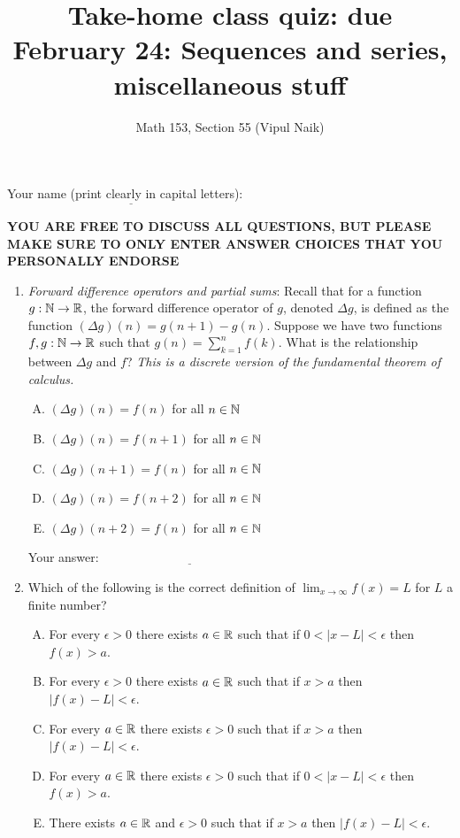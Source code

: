 \documentclass[10pt]{amsart}
\title{Take-home class quiz: due February 24: Sequences and series, miscellaneous stuff}
\author{Math 153, Section 55 (Vipul Naik)}
\begin{document}
\maketitle

Your name (print clearly in capital letters): $\underline{\qquad\qquad\qquad\qquad\qquad\qquad\qquad\qquad\qquad\qquad}$

{\bf YOU ARE FREE TO DISCUSS ALL QUESTIONS, BUT PLEASE MAKE SURE TO
ONLY ENTER ANSWER CHOICES THAT YOU PERSONALLY ENDORSE}

\begin{enumerate}
\item {\em Forward difference operators and partial sums}: Recall that
  for a function $g: \mathbb{N} \to \mathbb{R}$, the forward difference operator of
  $g$, denoted $\Delta g$, is defined as the function $(\Delta g)(n) =
  g(n+1) - g(n)$. Suppose we have two functions $f,g: \mathbb{N} \to \mathbb{R}$ such
  that $g(n) = \sum_{k=1}^n f(k)$. What is the relationship between
  $\Delta g$ and $f$? {\em This is a discrete version of the
  fundamental theorem of calculus.}

  \begin{enumerate}[(A)]
  \item $(\Delta g)(n) = f(n)$ for all $n \in \mathbb{N}$
  \item $(\Delta g)(n) = f(n + 1)$ for all $n \in \mathbb{N}$
  \item $(\Delta g)(n + 1) = f(n)$ for all $n \in \mathbb{N}$
  \item $(\Delta g)(n) = f(n + 2)$ for all $n \in \mathbb{N}$
  \item $(\Delta g)(n + 2) = f(n)$ for all $n \in \mathbb{N}$
  \end{enumerate}

  \vspace{0.1in}
  Your answer: $\underline{\qquad\qquad\qquad\qquad\qquad\qquad\qquad}$
  \vspace{0.15in}

\item Which of the following is the correct definition of $\lim_{x \to
  \infty} f(x) = L$ for $L$ a finite number?

  \begin{enumerate}[(A)]
  \item For every $\epsilon > 0$ there exists $a \in \mathbb{R}$ such that if
    $0 < |x - L| < \epsilon$ then $f(x) > a$.
  \item For every $\epsilon > 0$ there exists $a \in \mathbb{R}$ such that if
    $x > a$ then $|f(x) - L| < \epsilon$.
  \item For every $a \in \mathbb{R}$ there exists $\epsilon > 0$ such that if
    $x > a$ then $|f(x) - L| < \epsilon$.
  \item For every $a \in \mathbb{R}$ there exists $\epsilon > 0$ such that if
    $0 < |x - L| < \epsilon$ then $f(x) > a$.
  \item There exists $a \in \mathbb{R}$ and $\epsilon > 0$ such that if $x >
    a$ then $|f(x) - L| < \epsilon$.
  \end{enumerate}


\end{enumerate}
\end{document}
